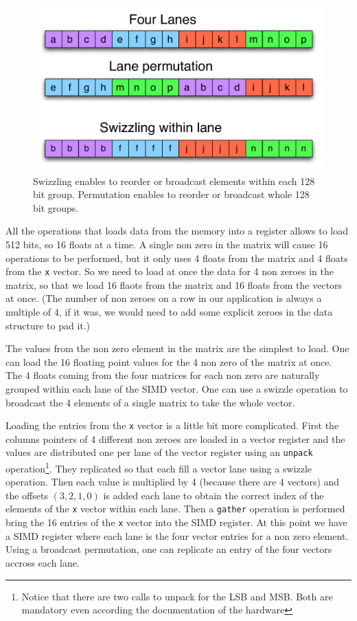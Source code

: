 \documentclass[10pt,conference,compsocconf]{IEEEtran}
\begin{document}
\begin{figure}
  \centering
  \includegraphics[width=\linewidth]{figures/swizzling_lanes.pdf}
  \caption{Swizzling enables to reorder or broadcast elements within
    each 128 bit group. Permutation enables to reorder or broadcast
    whole 128 bit groups.}
  \label{fig:swizzling_permutation}
\end{figure}

All the operations that loads data from the memory into a register
allows to load 512 bits, so 16 floats at a time. A single non zero in
the matrix will cause 16 operations to be performed, but it only uses
4 floats from the matrix and 4 floats from the {\tt x} vector. So we
need to load at once the data for 4 non zeroes in the matrix, so that
we load 16 flaots from the matrix and 16 floats from the vectors at
once. (The number of non zeroes on a row in our application is always
a multiple of 4, if it was, we would need to add some explicit zeroes
in the data structure to pad it.)

The values from the non zero element in the matrix are the simplest to
load. One can load the 16 floating point values for the 4 non zero of
the matrix at once. The 4 floats coming from the four matrices for
each non zero are naturally grouped within each lane of the SIMD
vector. One can use a swizzle operation to broadcast the 4 elements of
a single matrix to take the whole vector.

Loading the entries from the {\tt x} vector is a little bit more
complicated. First the columns pointers of 4 different non zeroes are
loaded in a vector register and the values are distributed one per
lane of the vector register using an {\tt unpack}
operation\footnote{Notice that there are two calls to unpack for the
  LSB and MSB. Both are mandatory even according the documentation of
  the hardware}. They replicated so that each fill a vector lane using
a swizzle operation. Then each value is multiplied by 4 (because there
are 4 vectors) and the offsets $(3,2,1,0)$ is added each lane to
obtain the correct index of the elements of the {\tt x} vector within
each lane. Then a {\tt gather} operation is performed bring the 16
entries of the {\tt x} vector into the SIMD register. At this point we
have a SIMD register where each lane is the four vector entries for a
non zero element. Using a broadcast permutation, one can replicate an
entry of the four vectors accross each lane.
\end{document}
